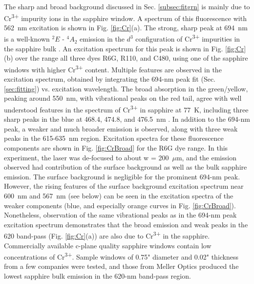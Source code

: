 The sharp and broad background discussed in Sec. \ref{subsec:fitgrn} is mainly due to Cr\textsuperscript{3+} impurity ions in the sapphire window.  A spectrum of this fluorescence with 562~nm excitation is shown in Fig. \ref{fig:Cr}(a).  The strong, sharp peak at 694~nm is a well-known $^{2}E$ - $^{4}A_{2}$ emission in the $d^{3}$ configuration of Cr\textsuperscript{3+} impurities in the sapphire bulk \cite{SapphireRlines1964,SapphireRlines2010}.  An excitation spectrum for this peak is shown in Fig. \ref{fig:Cr}(b) over the range all three dyes R6G, R110, and C480, using one of the sapphire windows with higher Cr\textsuperscript{3+} content.  Multiple features are observed in the excitation spectrum, obtained by integrating the 694-nm peak fit (Sec. \ref{sec:fitting}) vs. excitation wavelength.  The broad absorption in the green/yellow, peaking around 550~nm, with vibrational peaks on the red tail, agree with well understood features in the spectrum of Cr\textsuperscript{3+} in sapphire at 77~K, including three sharp peaks in the blue at 468.4, 474.8, and 476.5~nm \cite{SapphireFord,SapphireMcclure}.  In addition to the 694-nm peak, a weaker and much broader emission is observed, along with three weak peaks in the 615-635~nm region.  Excitation spectra for these fluorescence components are shown in Fig. \ref{fig:CrBroad} for the R6G dye range.  In this experiment, the laser was de-focused to about w = 200~$\mu$m, and the emission observed had contribution of the surface background as well as the bulk sapphire emission.  The surface background is negligible for the prominent 694-nm peak.  However, the rising features of the surface background excitation spectrum near 600~nm and 567~nm (see below) can be seen in the excitation spectra of the weaker components (blue, and especially orange curves in Fig. \ref{fig:CrBroad}).  Nonetheless, observation of the same vibrational peaks as in the 694-nm peak excitation spectrum demonstrates that the broad emission and weak peaks in the 620 band-pass (Fig. \ref{fig:Cr}(a)) are also due to Cr\textsuperscript{3+} in the sapphire.  Commercially available c-plane quality sapphire windows contain low concentrations of Cr\textsuperscript{3+}.  Sample windows of 0.75" diameter and 0.02" thickness from a few companies were tested, and those from Meller Optics produced the lowest sapphire bulk emission in the 620-nm band-pass region.

